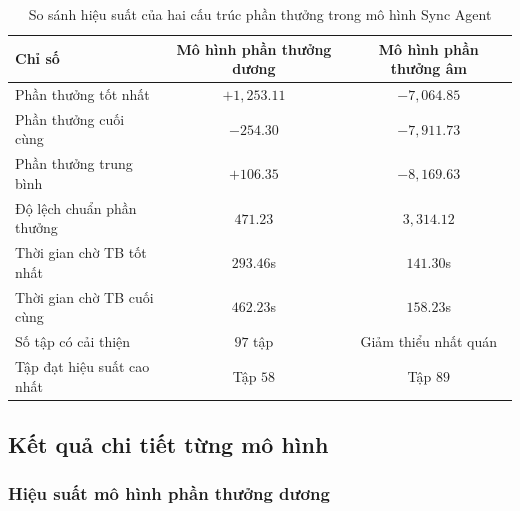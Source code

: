 \begin{table}[!htp]
    \centering
    \caption{So sánh hiệu suất của hai cấu trúc phần thưởng trong mô hình Sync Agent}
    \label{tab:sync_performance_comparison}
    \begin{tabular}{@{}lcc@{}}
        \toprule
        \textbf{Chỉ số} & \textbf{Mô hình phần thưởng dương} & \textbf{Mô hình phần thưởng âm} \\
        \midrule
        Phần thưởng tốt nhất      & $+1,253.11$                      & $-7,064.85$                      \\
        Phần thưởng cuối cùng     & $-254.30$                        & $-7,911.73$                      \\
        Phần thưởng trung bình    & $+106.35$                        & $-8,169.63$                      \\
        Độ lệch chuẩn phần thưởng & $471.23$                         & $3,314.12$                       \\
        Thời gian chờ TB tốt nhất & $293.46$s                        & $141.30$s                        \\
        Thời gian chờ TB cuối cùng & $462.23$s                        & $158.23$s                        \\
        Số tập có cải thiện       & $97$ tập                         & Giảm thiểu nhất quán            \\
        Tập đạt hiệu suất cao nhất & Tập $58$                         & Tập $89$                         \\
        \bottomrule
    \end{tabular}
\end{table}

\subsection{Kết quả chi tiết từng mô hình}

\subsubsection{Hiệu suất mô hình phần thưởng dương}

